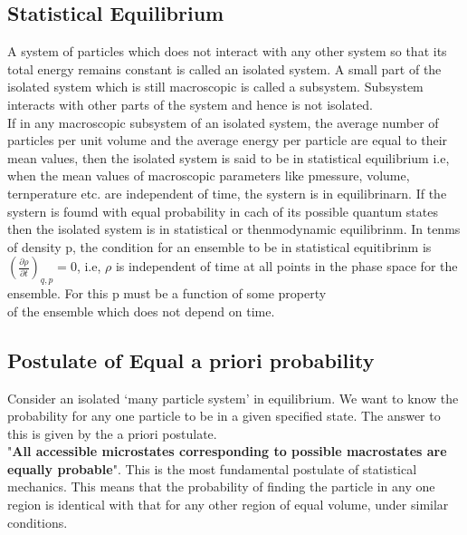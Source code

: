 \subsection{Statistical Equilibrium}
A system of particles which does not interact with any other system so that its total energy remains constant is called an isolated system. A small part of the isolated system which is still macroscopic is called a subsystem. Subsystem interacts with other parts of the system and hence is not isolated.\\
If in any macroscopic subsystem of an isolated system, the average number of particles per unit volume and the average energy per particle are equal to their mean values, then the isolated system is said to be in statistical equilibrium i.e, when the mean values of macroscopic parameters like pmessure, volume, ternperature etc. are independent of time, the systern is in equilibrinarn. If the systern is foumd with equal probability in cach of its possible quantum states then the isolated system is in statistical or thenmodynamic equilibrinm. In tenms of density p, the condition for an ensemble to be in statistical equitibrinm is $\left(\frac{\partial \rho}{\partial t}\right)_{q, p}=0$, i.e, $\rho$ is independent of time at all points in the phase space for the ensemble. For this p must be a function of some property\\
of the ensemble which does not depend on time.
\subsection{Postulate of Equal a priori probability}
Consider an isolated `many particle system' in equilibrium. We want to know the probability for any one particle to be in a given specified state. The answer to this is given by the a priori postulate.\\
"\textbf{All accessible microstates corresponding to possible macrostates are equally probable}". This is the most fundamental postulate of statistical mechanics. This means that the probability of finding the particle in any one region is identical with that for any other region of equal volume, under similar conditions.






